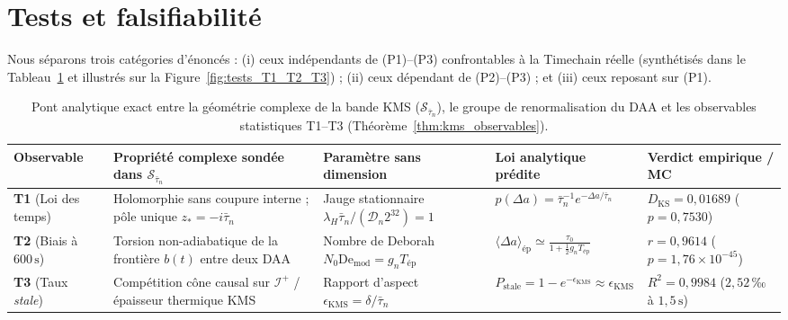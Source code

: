 \documentclass[10pt,twocolumn,a4paper]{article}
\theoremstyle{plain}
\theoremstyle{definition}
\theoremstyle{remark}
\newcommand{\scri}{\mathcal{I}}
\begin{document}
\section{Tests et falsifiabilité}
\label{sec:tests}

Nous séparons trois catégories d'énoncés : (i) ceux indépendants de (P1)--(P3) confrontables à la Timechain réelle (synthétisés dans le Tableau~\ref{tab:kms_empirical_bridge} et illustrés sur la Figure~\ref{fig:tests_T1_T2_T3}) ; (ii) ceux dépendant de (P2)--(P3) ; et (iii) ceux reposant sur (P1).

\begin{table}[t]
\centering
\caption{Pont analytique exact entre la géométrie complexe de la bande KMS ($\mathcal{S}_{\bar{\tau}_n}$), le groupe de renormalisation du DAA et les observables statistiques T1--T3 (Théorème~\ref{thm:kms_observables}).}
\label{tab:kms_empirical_bridge}
\renewcommand{\arraystretch}{1.22}
\footnotesize
\begin{tabular}{@{}p{2.5cm}p{4.3cm}p{3.4cm}p{3.3cm}p{3.3cm}@{}}
\toprule
\textbf{Observable} & \textbf{Propriété complexe sondée dans $\mathcal{S}_{\bar{\tau}_n}$} & \textbf{Paramètre sans dimension} & \textbf{Loi analytique prédite} & \textbf{Verdict empirique / MC} \\
\midrule
\textbf{T1} (Loi des temps) & Holomorphie sans coupure interne ; pôle unique $z_* = -i\bar{\tau}_n$ & Jauge stationnaire $\lambda_H \bar{\tau}_n / (\mathcal{D}_n 2^{32}) = 1$ & $p(\Delta a) = \bar{\tau}_n^{-1} e^{-\Delta a/\bar{\tau}_n}$ & $D_{\text{KS}} = 0{,}01689$ ($p = 0{,}7530$) \\
\textbf{T2} (Biais à $600\,\text{s}$) & Torsion non-adiabatique de la frontière $b(t)$ entre deux DAA & Nombre de Deborah $N_0 \mathrm{De}_{\text{mod}} = g_n T_{\text{ép}}$ & $\langle \Delta a \rangle_{\text{ép}} \simeq \frac{\tau_0}{1 + \frac{1}{2} g_n T_{\text{ép}}}$ & $r = 0{,}9614$ ($p = 1{,}76 \times 10^{-45}$) \\
\textbf{T3} (Taux \textit{stale}) & Compétition cône causal sur $\scri^+$ / épaisseur thermique KMS & Rapport d'aspect $\epsilon_{\text{KMS}} = \delta / \bar{\tau}_n$ & $P_{\text{stale}} = 1 - e^{-\epsilon_{\text{KMS}}} \approx \epsilon_{\text{KMS}}$ & $R^2 = 0{,}9984$ ($2{,}52\,\text{‰}$ à $1{,}5\,\text{s}$) \\
\bottomrule
\end{tabular}
\end{table}
\end{document}
